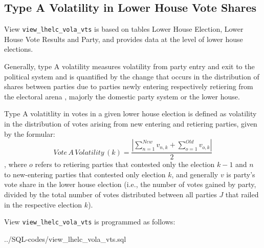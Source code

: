 \subsection{Type A Volatility in Lower House Vote Shares}\label{view_lhelc_vola_vts}
View \texttt{\footnotesize view\_lhelc\_vola\_vts} is based on tables Lower House Election, Lower House Vote Results and Party, and provides data at the level of lower house elections.

Generally, type A volatility measures volatility from party entry and exit to the political system and is quantified by the change that occurs in the distribution of shares between parties due to parties newly entering respectively retiering from the electoral arena \citep{Powell&Tucker2013}, majorly the domestic party system or the lower house. 

Type A volatitlity in votes in a given lower house election is defined as volatility in the distribution of votes arising from new entering and retiering parties, given by the formular: 
\begin{equation}\label{equ_vote_a_volatility}
Vote\,A\,Volatility\,(k) = \frac{ | \sum\limits_{n=1}^{New} v_{n,k} + \sum\limits_{o=1}^{Old} v_{o,k} | }{2}
\end{equation}
, where $o$ refers to retiering parties that contested only the election $k-1$ and $n$ to new-entering
parties that contested only election $k$, and generally $v$ is party's vote share in the lower house election (i.e., the number of votes gained by party, divided by the total number of votes distributed between all parties $J$ that railed in the respective election $k$).


View \texttt{\footnotesize view\_lhelc\_vola\_vts} is programmed as follows:

%
{../SQL-codes/view_lhelc_vola_vts.sql}

